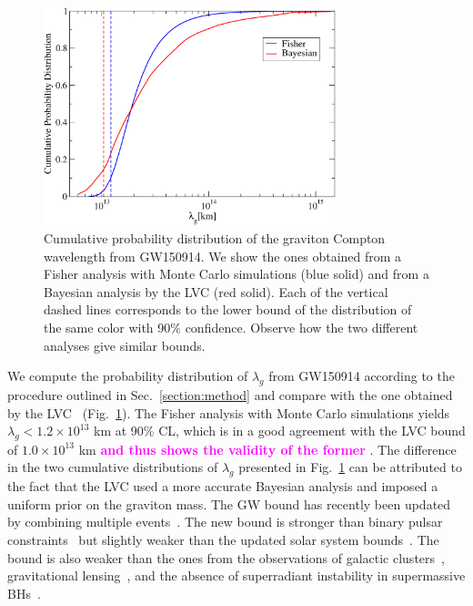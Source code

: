 \documentclass[prd,twocolumn,nofootinbib]{revtex4-1}
\newcommand{\kent}[1]{\textcolor{magenta}{\textbf{#1}} }
\begin{document}
\begin{figure}[htb]
\includegraphics[width=8.5cm]{graviton.pdf}
\caption{Cumulative probability distribution of the graviton Compton wavelength from GW150914. We show the ones obtained from a Fisher analysis with Monte Carlo simulations (blue solid) and from a Bayesian analysis by the LVC (red solid). Each of the vertical dashed lines corresponds to the lower bound of the distribution of the same color with 90\% confidence. Observe how the two different analyses give similar bounds.}
\label{fig:graviton}
\end{figure}

We compute the probability distribution of $\lambda_g$ from GW150914 according to the procedure outlined in Sec.~\ref{section:method} and compare with the one obtained by the LVC~\cite{TheLIGOScientific:2016src} (Fig.~\ref{fig:graviton}). The Fisher analysis with Monte Carlo simulations yields $\lambda_g<1.2\times 10^{13}$ km at 90\% CL, which is in a good agreement with the LVC bound of $1.0\times10^{13}$ km \kent{and thus shows the validity of the former}. The difference in the two cumulative distributions of $\lambda_g$ presented in Fig.~\ref{fig:graviton} can be attributed to the fact that the LVC used a more accurate Bayesian analysis and imposed a uniform prior on the graviton mass.
The GW bound has recently been updated by combining multiple events~\cite{LIGOScientific:2019fpa}. The new bound is stronger than binary pulsar constraints~\cite{Finn:2001qi,Miao:2019nhf} but slightly weaker than the updated solar system bounds~\cite{Will:2018gku}. The bound is also weaker than the ones from the observations of galactic clusters~\cite{Goldhaber:1974wg}, gravitational lensing~\cite{Choudhury:2002pu}, and the absence of superradiant instability in supermassive BHs~\cite{Brito:2013wya}.
\end{document}
